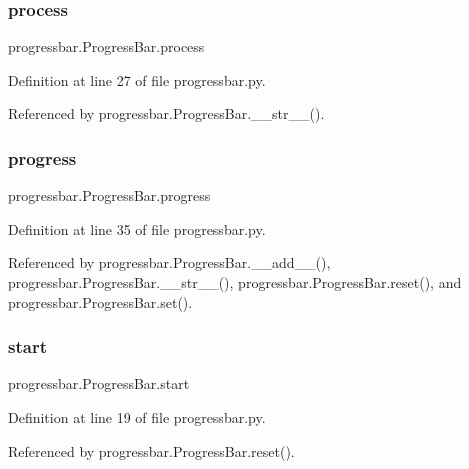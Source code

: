 \subsubsection{\texorpdfstring{process}{process}}
{\footnotesize\ttfamily progressbar.\+Progress\+Bar.\+process}



Definition at line 27 of file progressbar.\+py.



Referenced by progressbar.\+Progress\+Bar.\+\_\+\+\_\+str\+\_\+\+\_\+().

\mbox{\label{classprogressbar_1_1ProgressBar_a3adc96f42e6891bcd2885c9ef29767f3}} 
\subsubsection{\texorpdfstring{progress}{progress}}
{\footnotesize\ttfamily progressbar.\+Progress\+Bar.\+progress}



Definition at line 35 of file progressbar.\+py.



Referenced by progressbar.\+Progress\+Bar.\+\_\+\+\_\+add\+\_\+\+\_\+(), progressbar.\+Progress\+Bar.\+\_\+\+\_\+str\+\_\+\+\_\+(), progressbar.\+Progress\+Bar.\+reset(), and progressbar.\+Progress\+Bar.\+set().

\mbox{\label{classprogressbar_1_1ProgressBar_a550afef3072c2412e2aa906b12c33bbe}} 
\subsubsection{\texorpdfstring{start}{start}}
{\footnotesize\ttfamily progressbar.\+Progress\+Bar.\+start}



Definition at line 19 of file progressbar.\+py.



Referenced by progressbar.\+Progress\+Bar.\+reset().

\mbox{\label{classprogressbar_1_1ProgressBar_ac076ee00e3a70c69b8583668c165415a}} 
